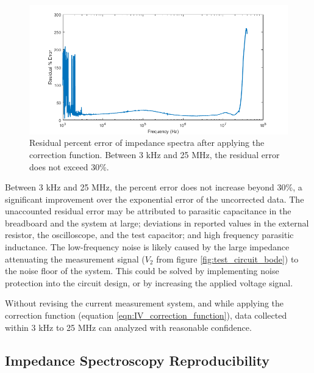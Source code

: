 \begin{figure}[H]
    \centering
    \includegraphics[width=\textwidth]{images/residualPercentError.png}
    \caption[Residual percent error of impedance spectra after applying the correction function.]{Residual percent error of impedance spectra after applying the correction function. Between 3 kHz and 25 MHz, the residual error does not exceed 30$\%$.}
    \label{fig:IS_residual_error}
\end{figure}


\par Between 3 kHz and 25 MHz, the percent error does not increase beyond 30\%, a significant improvement over the exponential error of the uncorrected data. The unaccounted residual error may be attributed to parasitic capacitance in the breadboard and the system at large; deviations in reported values in the external resistor, the oscilloscope, and the test capacitor; and high frequency parasitic inductance. The low-frequency noise is likely caused by the large impedance attenuating the measurement signal ($V_2$ from figure \ref{fig:test_circuit_bode}) to the noise floor of the system. This could be solved by implementing noise protection into the circuit design, or by increasing the applied voltage signal. 

\par Without revising the current measurement system, and while applying the correction function (equation \ref{eqn:IV_correction_function}), data collected within 3 kHz to 25 MHz can analyzed with reasonable confidence. 

\FloatBarrier

\clearpage

\subsection{Impedance Spectroscopy Reproducibility}

